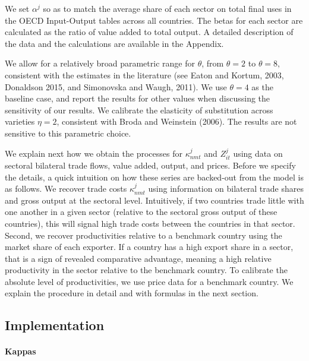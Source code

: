 \documentclass{article}
\begin{document}
We set $\alpha ^{j}$ so as to match the average share of each sector on
total final uses in the OECD Input-Output tables across all countries. The
betas for each sector are calculated as the ratio of value added to total
output. A detailed description of the data and the calculations are
available in the Appendix.

We allow for a relatively broad parametric range for $\theta $, from $\theta
=2$ to $\theta =8,$ consistent with the estimates in the literature (see
Eaton and Kortum, 2003, Donaldson 2015, and Simonovska and Waugh, 2011). We
use $\theta =4$ as the baseline case, and report the results for other
values when discussing the sensitivity of our results. We calibrate the
elasticity of substitution across varieties $\eta =2$, consistent with Broda
and Weinstein (2006). The results are not sensitive to this parametric
choice.

We explain next how we obtain the processes for $\kappa _{nmt}^{j}$ and $%
Z_{it}^{j}$ using data on sectoral bilateral trade flows, value added,
output, and prices. Before we specify the details, a quick intuition on how
these series are backed-out from the model is as follows. We recover trade
costs $\kappa _{nmt}^{j}$ using information on bilateral trade shares and
gross output at the sectoral level. Intuitively, if two countries trade
little with one another in a given sector (relative to the sectoral gross
output of these countries), this will signal high trade costs between the
countries in that sector. Second, we recover productivities relative to a
benchmark country using the market share of each exporter. If a country has
a high export share in a sector, that is a sign of revealed comparative
advantage, meaning a high relative productivity in the sector relative to
the benchmark country. To calibrate the absolute level of productivities, we
use price data for a benchmark country. We explain the procedure in detail
and with formulas in the next section.

\subsection{Implementation}

\paragraph{Kappas}
\end{document}
